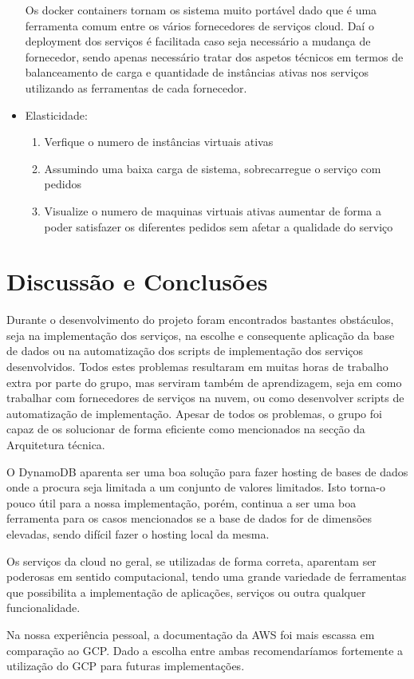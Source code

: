 \documentclass[11pt,a4paper]{article}
\begin{document}
\begin{itemize}
Os docker containers tornam os sistema muito portável dado que é uma ferramenta comum entre os vários fornecedores de serviços cloud. Daí o deployment dos serviços é facilitada caso seja necessário a mudança de fornecedor, sendo apenas necessário tratar dos aspetos técnicos em termos de balanceamento de carga e quantidade de instâncias ativas nos serviços utilizando as ferramentas de cada fornecedor.

	\item Elasticidade:
	\begin{enumerate}
		\item Verfique o numero de instâncias virtuais ativas
		\item Assumindo uma baixa carga de sistema, sobrecarregue o serviço com pedidos
		\item Visualize o numero de maquinas virtuais ativas aumentar de forma a poder satisfazer os diferentes pedidos sem afetar a qualidade do serviço
	\end{enumerate}
\end{itemize}

\section{Discussão e Conclusões}
Durante o desenvolvimento do projeto foram encontrados bastantes obstáculos, seja na implementação dos serviços, na escolhe e consequente aplicação da base de dados ou na automatização dos scripts de implementação dos serviços desenvolvidos. Todos estes problemas resultaram em muitas horas de trabalho extra por parte do grupo, mas serviram também de aprendizagem, seja em como trabalhar com fornecedores de serviços na nuvem, ou como desenvolver scripts de automatização de implementação. Apesar de todos os problemas, o grupo foi capaz de os solucionar de forma eficiente como mencionados na secção da Arquitetura técnica.

O DynamoDB aparenta ser uma boa solução para fazer hosting de bases de dados onde a procura seja limitada a um conjunto de valores limitados. Isto torna-o pouco útil para a nossa implementação, porém, continua a ser uma boa ferramenta para os casos mencionados se a base de dados for de dimensões elevadas, sendo difícil fazer o hosting local da mesma.

Os serviços da cloud no geral, se utilizadas de forma correta, aparentam ser poderosas em sentido computacional, tendo uma grande variedade de ferramentas que possibilita a implementação de aplicações, serviços ou outra qualquer funcionalidade.

Na nossa experiência pessoal, a documentação da AWS foi mais escassa em comparação ao GCP. Dado a escolha entre ambas recomendaríamos fortemente a utilização do GCP para futuras implementações.
\end{document}
